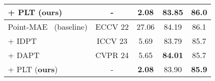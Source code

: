 \begin{table}
\begin{tabular}{lcccc}
    \rowcolor{linecolor!40}+ PLT (\textbf{ours})& - & \textbf{2.08}  & \textbf{83.85} & \textbf{86.0} \\
    \midrule
    Point-MAE~\cite{pang2022masked} (baseline) &  ECCV 22 & 27.06 & 84.19 & 86.1 \\ 
    + IDPT~\cite{zha2023instance} & ICCV 23 & 5.69  & 83.79  & 85.7  \\
    + DAPT~\cite{zhou2024dynamic} & CVPR 24 & 5.65  & \textbf{84.01} & 85.7 \\
    \rowcolor{linecolor!40}+ PLT (\textbf{ours})& - & \textbf{2.08}  & 83.90 & \textbf{85.9} \\
    \bottomrule
    \end{tabular}
  \label{tab:segmentation}
\end{table}